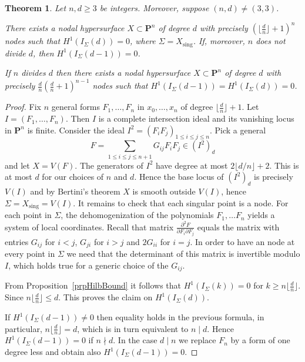 \documentclass{amsart}
\newcommand{\Ps}{\mathbf{P}}
\newtheorem{theorem}[lemma]{Theorem}
\theoremstyle{definition}
\theoremstyle{remark}
\DeclareMathOperator{\sing}{sing}
\begin{document}
\begin{theorem}\label{thmLowerSur} Let $n,d\geq 3$ be integers.  Moreover, suppose $(n,d)\neq (3,3)$. 

There exists a nodal hypersurface $X\subset\Ps^{n}$ of degree $d$ with precisely $(\lfloor \frac{d}{n} \rfloor+1)^{n}$ nodes such that $H^1(I_{\Sigma} (d))=0$, where $\Sigma=X_{\sing}$. If, moreover, $n$ does not divide $d$, then  $H^1(I_{\Sigma} (d-1))=0$.

If $n$  divides $d$ then there exists a nodal hypersurface $X\subset\Ps^{n}$ of degree $d$ with precisely $\frac{d}{n} (\frac{d}{n}+1)^{n-1}$ nodes such that $H^1(I_{\Sigma} (d-1))=H^1(I_{\Sigma} (d))=0$. 
\end{theorem}

\begin{proof}
Fix $n$ general forms $F_1,\dots,F_n$ in $x_0,\dots,x_n$ of degree $\lfloor \frac{d}{n} \rfloor+1$. Let $I=(F_1,\dots,F_{n})$. Then $I$ is a complete intersection ideal and its vanishing locus in $\Ps^n$ is finite.
Consider the ideal  $I^2=(F_iF_j)_{1\leq i\leq j\leq n}$. Pick a general 
\[F=\sum_{1\leq i\leq j \leq n+1} G_{ij}F_iF_j \in (I^2)_d\] and let $X=V(F)$.
The generators of $I^2$ have  degree  at most $2\lfloor d/n \rfloor+2$. This is at most  $d$ for our choices of $n$ and $d$.
Hence the base locus of $(I^2)_d$ is precisely $V(I)$ and by Bertini's theorem $X$ is smooth outside $V(I)$, hence $\Sigma=X_{\sing}=V(I)$. It remains to check that each singular point is a  node. For each point in $\Sigma$, the dehomogenization of the  polynomials $F_1,\dots F_{n}$ yields a  system of local coordinates. Recall that matrix  $\frac{ \partial^2 F}{\partial F_i\partial F_j}$ equals the matrix with entries $G_{ij}$ for $i<j$, $G_{ji}$ for $i>j$ and $2G_{ii}$ for $i=j$.
In order to have an node at every point in $\Sigma$ we need that the determinant of this matrix is invertible modulo $I$, which holds true for a generic choice of the $G_{ij}$.

From Proposition~\ref{prpHilbBound} it follows that $H^1(I_{\Sigma}(k))=0$ for $k\geq n \lfloor \frac{d}{n} \rfloor $. Since $n \lfloor \frac{d}{n} \rfloor\leq d$. This proves the claim on $H^1(I_\Sigma(d))$.
 
 If $H^1(I_{\Sigma}(d-1))\neq 0$ then equality holds in the previous formula, in particular, $n \lfloor \frac{d}{n}\rfloor =d$, which is in turn equivalent to  $n\mid d$. Hence $H^1(I_{\Sigma}(d-1))=0$ if $n\nmid d$. In the case $d\mid n$  we replace $F_{n}$ by a form of one degree less and obtain also  $H^1(I_{\Sigma}(d-1))=0$. 
\end{proof}
\end{document}
